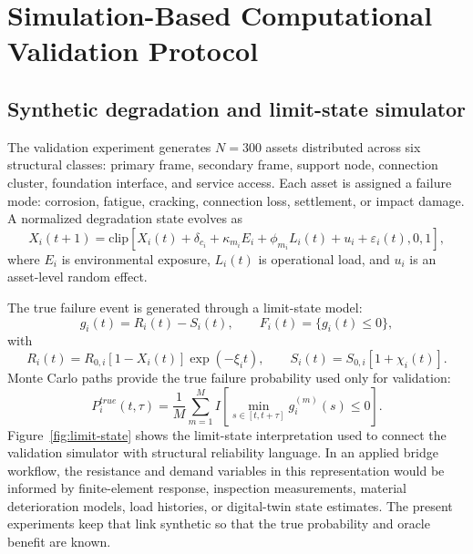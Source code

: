 \documentclass[cmes,article,submit,moreauthors,pdftex]{Definitions/tsp}
\begin{document}
\section{Simulation-Based Computational Validation Protocol}

\subsection{Synthetic degradation and limit-state simulator}

The validation experiment generates $N=300$ assets distributed across six structural classes: primary frame, secondary frame, support node, connection cluster, foundation interface, and service access. Each asset is assigned a failure mode: corrosion, fatigue, cracking, connection loss, settlement, or impact damage. A normalized degradation state evolves as
\begin{equation}
X_i(t+1)=
\mathrm{clip}\left[
X_i(t)+\delta_{c_i}+\kappa_{m_i}E_i+\phi_{m_i}L_i(t)+u_i+\varepsilon_i(t),0,1
\right],
\end{equation}
where $E_i$ is environmental exposure, $L_i(t)$ is operational load, and $u_i$ is an asset-level random effect.

The true failure event is generated through a limit-state model:
\begin{equation}
g_i(t)=R_i(t)-S_i(t),\qquad F_i(t)=\{g_i(t)\le0\},
\end{equation}
with
\begin{equation}
R_i(t)=R_{0,i}[1-X_i(t)]\exp(-\xi_i t),
\qquad
S_i(t)=S_{0,i}[1+\chi_i(t)].
\end{equation}
Monte Carlo paths provide the true failure probability used only for validation:
\begin{equation}
P_i^{true}(t,\tau)=
\frac{1}{M}\sum_{m=1}^{M}
I\left[\min_{s\in[t,t+\tau]}g_i^{(m)}(s)\le0\right].
\end{equation}
Figure~\ref{fig:limit-state} shows the limit-state interpretation used to connect the validation simulator with structural reliability language. In an applied bridge workflow, the resistance and demand variables in this representation would be informed by finite-element response, inspection measurements, material deterioration models, load histories, or digital-twin state estimates. The present experiments keep that link synthetic so that the true probability and oracle benefit are known.
\end{document}
